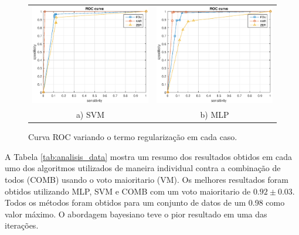 \documentclass[12pt]{article}
\begin{document}
\begin{figure}[!h]
\centering
\begin{tabular}{cc}
\includegraphics[width=2.5in]{../out/svm-roc.eps}&
\includegraphics[width=2.5in]{../out/mlp-roc.eps} \\
a) SVM  & b) MLP
\end{tabular}
\caption{Curva ROC variando o termo regularização em cada caso.}
\label{fig:roc_curve}
\end{figure}
 
 
 
A Tabela \ref{tab:analisis_data} mostra um resumo dos resultados obtidos em cada umo dos algoritmos utilizados de maneira individual contra a combinação de todos (COMB) usando o  voto maioritario (VM). Os melhores resultados foram obtidos utilizando MLP, SVM e COMB com um voto maioritario de $0.92 \pm 0.03$. Todos os métodos foram obtidos para um conjunto de datos de um 0.98 como valor máximo. O abordagem bayesiano teve o pior resultado em uma das iterações.
 
 
\end{document}
